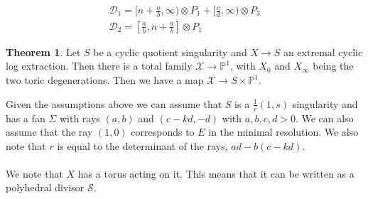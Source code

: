 \documentclass[11pt]{amsart}
\theoremstyle{definition}
\newtheorem{thm}{Theorem}[section]
\theoremstyle{definition}
\theoremstyle{definition}
\theoremstyle{definition}
\theoremstyle{definition}
\theoremstyle{definition}
\theoremstyle{definition}
\theoremstyle{definition}
\newcommand{\mb}[1]{\mathbb{#1}}
\newcommand{\ra}{\rightarrow}
\begin{document}
\[
\begin{array}{l}
\mathcal{D}_1 = [ n + \frac{a}{b}, \infty) \otimes P_1 + [\frac{c}{d}, \infty) \otimes P_3 \\
\mathcal{D}_2 =  [\frac{a}{b}, n + \frac{a}{b}] \otimes P_1
\end{array}
\]
\newline
\begin{thm}
Let $S$ be a cyclic quotient singularity and $X \ra S$ an extremal cyclic log extraction. Then there is a total family $\mathcal{X} \ra \mb{P}^1$, with $X_0$ and $X_\infty$ being the two toric degenerations. Then we have a map $\mathcal{X} \ra S \times \mb{P}^1$.
\end{thm}
\vspace{0.1cm}
Given the assumptions above we can assume that $S$ is a $\frac{1}{r}(1,s)$ singularity and has a fan $\Sigma$ with rays $(a,b)$ and $(c-kd,-d)$ with $a,b,c,d  > 0$. We can also assume that the ray $(1,0)$ corresponds to $E$ in the minimal resolution. We also note that $r$ is equal to the determinant of the rays, $ad - b(c-kd)$. 
\\
\\
We note that $X$ has a torus acting on it. This means that it can be written as a polyhedral divisor $\mathcal{S}$.
\begin{comment}
\begin{figure}[htbp]
\psset{unit=0.95cm}
\begin{pspicture}(0,-6)(12,0)
\psframe[linecolor=white](0.5,-4.5)(3.5,-1.5)


\psline{<-|}(6,-3)(7.5,-3)
\psline{|->}(7.5,-3)(10,-3)
\rput[bl]{0}(11,-3){$\mathcal{S}_1$}
\uput*[270](7.6,-3.1){${\tiny \frac{a}{b}}$}

\psline{<-|}(6,-1.8)(7.25,-1.8)
\psline{-|}(7.25,-1.8)(8,-1.8)
\psline{->}(8,-1.8)(10,-1.8)
\uput*[270](7.2,-1.9){${\tiny {0}}$}
\uput*[270](8,-1.9){${\tiny{k}}$}
\rput[bl]{0}(11,-1.8){$\mathcal{S}_0$}
\rput[bl]{0}(9,-1.6){$\mathcal{D}_{\sigma_0}$}
\rput[bl]{0}(7.3,-1.6){$\mathcal{D}_{\sigma_1}$}


\psline{<-|}(6,-4.2)(9,-4.2)
\psline{|->}(9,-4.2)(10,-4.2)
\uput*[270](8.9,-4.3){${\tiny \frac{c-kd}{d}}$}
\rput[bl]{0}(11,-4.2){$\mathcal{S}_{\infty}$}
\rput[bl]{0}(9,-4){$\mathcal{D}_{\sigma_0}$}
\rput[bl]{0}(8,-5.5){$\mathcal{S}$}

\psline{|->}(5,-3)(5,-1)
\psline{|->}(5,-3)(5,-5)
\rput[bl]{0}(4.5,-5.5){$Y=\mathbb{P}^1$}


\end{pspicture}
\caption{Divisorial fan associated to $X$.}
\end{figure}
\end{comment}
\end{document}
